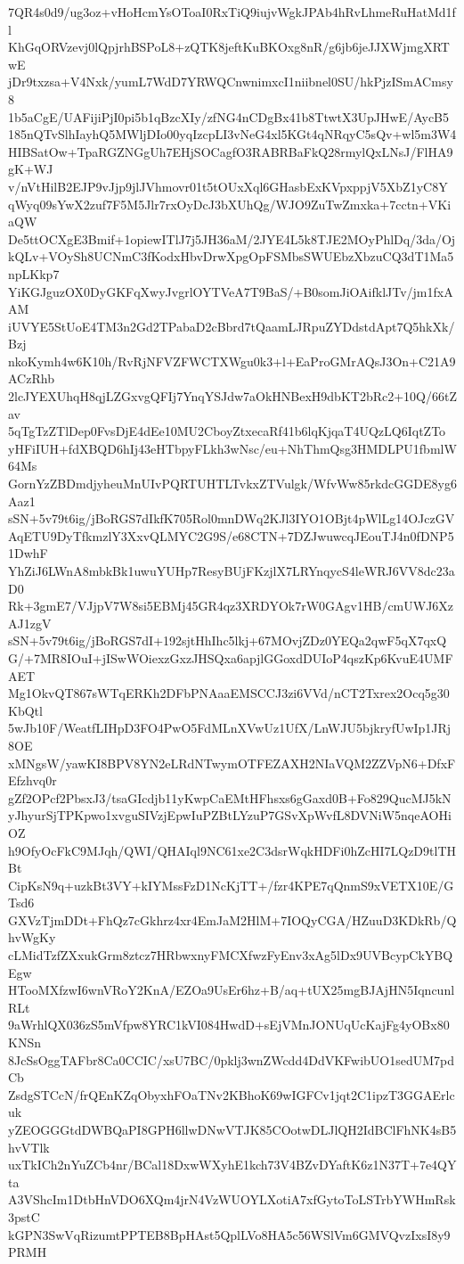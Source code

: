 7QR4s0d9/ug3oz+vHoHcmYsOToaI0RxTiQ9iujvWgkJPAb4hRvLhmeRuHatMd1fl
KhGqORVzevj0lQpjrhBSPoL8+zQTK8jeftKuBKOxg8nR/g6jb6jeJJXWjmgXRTwE
jDr9txzsa+V4Nxk/yumL7WdD7YRWQCnwnimxcI1niibnel0SU/hkPjzISmACmsy8
1b5aCgE/UAFijiPjI0pi5b1qBzcXIy/zfNG4nCDgBx41b8TtwtX3UpJHwE/AycB5
185nQTvSlhIayhQ5MWljDIo00yqIzcpLI3vNeG4xl5KGt4qNRqyC5sQv+wl5m3W4
HIBSatOw+TpaRGZNGgUh7EHjSOCagfO3RABRBaFkQ28rmylQxLNsJ/FlHA9gK+WJ
v/nVtHilB2EJP9vJjp9jlJVhmovr01t5tOUxXql6GHasbExKVpxppjV5XbZ1yC8Y
qWyq09sYwX2zuf7F5M5Jlr7rxOyDcJ3bXUhQg/WJO9ZuTwZmxka+7cctn+VKiaQW
De5ttOCXgE3Bmif+1opiewITlJ7j5JH36aM/2JYE4L5k8TJE2MOyPhlDq/3da/Oj
kQLv+VOySh8UCNmC3fKodxHbvDrwXpgOpFSMbsSWUEbzXbzuCQ3dT1Ma5npLKkp7
YiKGJguzOX0DyGKFqXwyJvgrlOYTVeA7T9BaS/+B0somJiOAifklJTv/jm1fxAAM
iUVYE5StUoE4TM3n2Gd2TPabaD2cBbrd7tQaamLJRpuZYDdstdApt7Q5hkXk/Bzj
nkoKymh4w6K10h/RvRjNFVZFWCTXWgu0k3+l+EaProGMrAQsJ3On+C21A9ACzRhb
2lcJYEXUhqH8qjLZGxvgQFIj7YnqYSJdw7aOkHNBexH9dbKT2bRc2+10Q/66tZav
5qTgTzZTlDep0FvsDjE4dEe10MU2CboyZtxecaRf41b6lqKjqaT4UQzLQ6IqtZTo
yHFiIUH+fdXBQD6hIj43eHTbpyFLkh3wNsc/eu+NhThmQsg3HMDLPU1fbmlW64Ms
GornYzZBDmdjyheuMnUIvPQRTUHTLTvkxZTVulgk/WfvWw85rkdcGGDE8yg6Aaz1
sSN+5v79t6ig/jBoRGS7dIkfK705Rol0mnDWq2KJl3IYO1OBjt4pWlLg14OJczGV
AqETU9DyTfkmzlY3XxvQLMYC2G9S/e68CTN+7DZJwuwcqJEouTJ4n0fDNP51DwhF
YhZiJ6LWnA8mbkBk1uwuYUHp7ResyBUjFKzjlX7LRYnqycS4leWRJ6VV8dc23aD0
Rk+3gmE7/VJjpV7W8si5EBMj45GR4qz3XRDYOk7rW0GAgv1HB/cmUWJ6XzAJ1zgV
sSN+5v79t6ig/jBoRGS7dI+192sjtHhIhc5lkj+67MOvjZDz0YEQa2qwF5qX7qxQ
G/+7MR8IOuI+jISwWOiexzGxzJHSQxa6apjlGGoxdDUIoP4qszKp6KvuE4UMFAET
Mg1OkvQT867sWTqERKh2DFbPNAaaEMSCCJ3zi6VVd/nCT2Txrex2Ocq5g30KbQtl
5wJb10F/WeatfLIHpD3FO4PwO5FdMLnXVwUz1UfX/LnWJU5bjkryfUwIp1JRj8OE
xMNgsW/yawKI8BPV8YN2eLRdNTwymOTFEZAXH2NIaVQM2ZZVpN6+DfxFEfzhvq0r
gZf2OPcf2PbsxJ3/tsaGIcdjb11yKwpCaEMtHFhsxs6gGaxd0B+Fo829QucMJ5kN
yJhyurSjTPKpwo1xvguSIVzjEpwIuPZBtLYzuP7GSvXpWvfL8DVNiW5nqeAOHiOZ
h9OfyOcFkC9MJqh/QWI/QHAIql9NC61xe2C3dsrWqkHDFi0hZcHI7LQzD9tlTHBt
CipKsN9q+uzkBt3VY+kIYMssFzD1NcKjTT+/fzr4KPE7qQnmS9xVETX10E/GTsd6
GXVzTjmDDt+FhQz7cGkhrz4xr4EmJaM2HlM+7IOQyCGA/HZuuD3KDkRb/QhvWgKy
cLMidTzfZXxukGrm8ztcz7HRbwxnyFMCXfwzFyEnv3xAg5lDx9UVBcypCkYBQEgw
HTooMXfzwI6wnVRoY2KnA/EZOa9UsEr6hz+B/aq+tUX25mgBJAjHN5IqncunlRLt
9aWrhlQX036zS5mVfpw8YRC1kVI084HwdD+sEjVMnJONUqUcKajFg4yOBx80KNSn
8JcSsOggTAFbr8Ca0CCIC/xsU7BC/0pklj3wnZWcdd4DdVKFwibUO1sedUM7pdCb
ZsdgSTCcN/frQEnKZqObyxhFOaTNv2KBhoK69wIGFCv1jqt2C1ipzT3GGAErlcuk
yZEOGGGtdDWBQaPI8GPH6llwDNwVTJK85COotwDLJlQH2IdBClFhNK4sB5hvVTlk
uxTkICh2nYuZCb4nr/BCal18DxwWXyhE1kch73V4BZvDYaftK6z1N37T+7e4QYta
A3VShcIm1DtbHnVDO6XQm4jrN4VzWUOYLXotiA7xfGytoToLSTrbYWHmRsk3pstC
kGPN3SwVqRizumtPPTEB8BpHAst5QplLVo8HA5c56WSlVm6GMVQvzIxsI8y9PRMH
